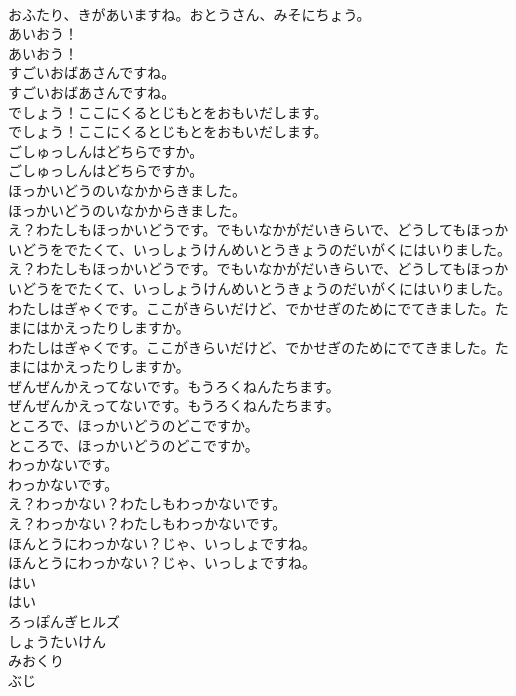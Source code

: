 \documentclass[8pt]{extreport}
\begin{document}
\begin{CJK}{UTF8}{min}
\\	おふたり、きがあいますね。おとうさん、みそにちょう。
\\	あいおう！
\\	あいおう！
\\	すごいおばあさんですね。
\\	すごいおばあさんですね。
\\	でしょう！ここにくるとじもとをおもいだします。
\\	でしょう！ここにくるとじもとをおもいだします。
\\	ごしゅっしんはどちらですか。
\\	ごしゅっしんはどちらですか。
\\	ほっかいどうのいなかからきました。
\\	ほっかいどうのいなかからきました。
\\	え？わたしもほっかいどうです。でもいなかがだいきらいで、どうしてもほっかいどうをでたくて、いっしょうけんめいとうきょうのだいがくにはいりました。
\\	え？わたしもほっかいどうです。でもいなかがだいきらいで、どうしてもほっかいどうをでたくて、いっしょうけんめいとうきょうのだいがくにはいりました。
\\	わたしはぎゃくです。ここがきらいだけど、でかせぎのためにでてきました。たまにはかえったりしますか。
\\	わたしはぎゃくです。ここがきらいだけど、でかせぎのためにでてきました。たまにはかえったりしますか。
\\	ぜんぜんかえってないです。もうろくねんたちます。
\\	ぜんぜんかえってないです。もうろくねんたちます。
\\	ところで、ほっかいどうのどこですか。
\\	ところで、ほっかいどうのどこですか。
\\	わっかないです。
\\	わっかないです。
\\	え？わっかない？わたしもわっかないです。
\\	え？わっかない？わたしもわっかないです。
\\	ほんとうにわっかない？じゃ、いっしょですね。
\\	ほんとうにわっかない？じゃ、いっしょですね。
\\	はい
\\	はい
\\	ろっぽんぎヒルズ
\\	しょうたいけん
\\	みおくり
\\	ぶじ

\end{CJK}
\end{document}
